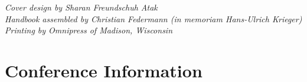 \documentclass[twoside,makeidx]{book}
\begin{document}


\fancyfoot[C]{}




\thispagestyle{empty}
\vspace*{6in}
\noindent\emph{Cover design by Sharan Freundschuh Atak}\\
\noindent\emph{Handbook assembled by Christian Federmann (\emph{\color{red}in memoriam Hans-Ulrich Krieger})}\\
\emph{Printing by Omnipress of Madison, Wisconsin}

\newpage
\cleardoublepage
\fancyfoot[C]{\thepage}
\frontmatter





\setcounter{tocdepth}{2}
\tableofcontents
\mainmatter
\pagestyle{fancy}


\clearpage


\chapter{Conference Information}


\clearpage


\clearpage%
\setheaders{}{}


%
\clearpage%
\setheaders{}{}
\end{document}
